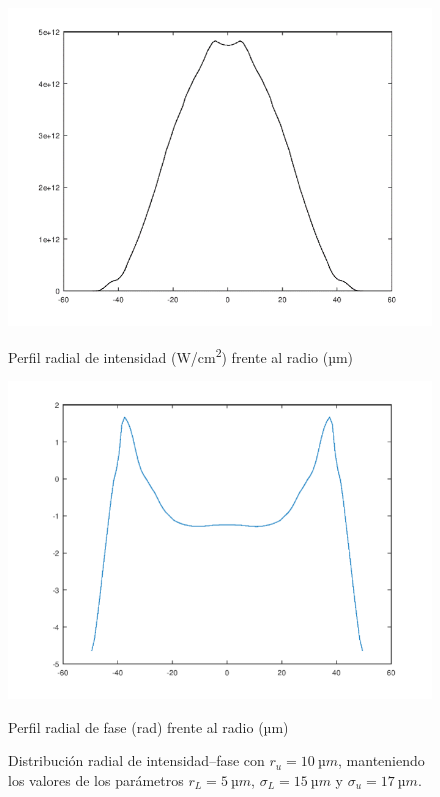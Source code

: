 \begin{figure}[htbp]
  \centering
  \begin{subcaptionblock}{.4\textwidth}
    \centering
    \includegraphics[width=\textwidth]{Figuras/ch4_int71.png}
    \caption{Perfil radial de intensidad (\unit{W/cm^2}) frente al radio (\unit{µm})}\label{fig:ch4_int71}
  \end{subcaptionblock}
  \begin{subcaptionblock}{.4\textwidth}
    \centering
    \includegraphics[width=\textwidth]{Figuras/ch4_fs71.png}
    \caption{Perfil radial de fase (\unit{rad}) frente al radio (\unit{µm})}\label{fig:ch4_fs71}
  \end{subcaptionblock}
   \caption{Distribución radial de intensidad--fase con $r_{u}=\qty{10}{µm}$, manteniendo los valores de los parámetros $r_{L}=\qty{5}{µm}$, $\sigma_{L}=\qty{15}{µm}$ y $\sigma_{u}=\qty{17}{µm}$.}
   \label{fig:4.29}
\end{figure}

